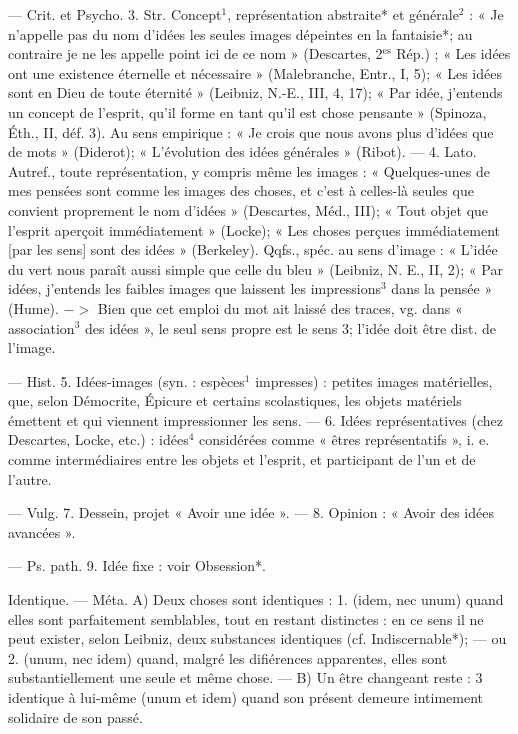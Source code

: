 — Crit. et Psycho. 3. Str. Concept$^1$, représentation abstraite* et
générale$^2$ : « Je n’appelle pas du nom
d’idées les seules images dépeintes en
la fantaisie*; au contraire je ne les
appelle point ici de ce nom » (Descartes, 2$^\text{es}$ Rép.) ; « Les idées ont une
existence éternelle et nécessaire »
(Malebranche, Entr., I, 5); « Les
idées sont en Dieu de toute éternité » (Leibniz, N.-E., III, 4, 17);
« Par idée, j'entends un concept de
l'esprit, qu'il forme en tant qu'il est
chose pensante » (Spinoza, Éth., II,
déf. 3). Au sens empirique : « Je
crois que nous avons plus d'idées
que de mots » (Diderot); « L’évolution des idées générales » (Ribot). —
4. Lato. Autref., toute représentation, y compris même les images :
« Quelques-unes de mes pensées
sont comme les images des choses,
et c’est à celles-là seules que convient proprement le nom d'idées »
(Descartes, Méd., III); « Tout objet
que l'esprit aperçoit immédiatement » (Locke); « Les choses perçues
immédiatement [par les sens] sont
des idées » (Berkeley). Qqfs., spéc.
au sens d'image : « L'idée du vert
nous paraît aussi simple que celle du
bleu » (Leibniz, N. E., II, 2); « Par
idées, j'entends les faibles images
que laissent les impressions$^3$ dans
la pensée » (Hume). $->$ Bien que
cet emploi du mot ait laissé des
traces, vg. dans « association$^3$ des
idées », le seul sens propre est le
sens 3; l'idée doit être dist. de
l’image.

— Hist. 5. Idées-images (syn. :
espèces$^1$ impresses) : petites images
matérielles, que, selon Démocrite,
Épicure et certains scolastiques, les
objets matériels émettent et qui viennent impressionner les sens. — 6.
Idées représentatives (chez Descartes, Locke, etc.) : idées$^4$ considérées comme « êtres représentatifs », i. e. comme intermédiaires
entre les objets et l’esprit, et participant de l’un et de l’autre.

— Vulg. 7. Dessein, projet
« Avoir une idée ». — 8. Opinion :
« Avoir des idées avancées ».

— Ps. path. 9. Idée fixe : voir
Obsession*.

Identique. — Méta. A) Deux choses
sont identiques : 1. (idem, nec unum)
quand elles sont parfaitement semblables, tout en restant distinctes :
en ce sens il ne peut exister, selon
Leibniz, deux substances identiques
(cf. Indiscernable*); — ou 2. (unum,
nec idem) quand, malgré les difiérences apparentes, elles sont substantiellement une seule et même
chose. — B) Un être changeant
reste : 3 identique à lui-même
(unum et idem) quand son présent
demeure intimement solidaire de
son passé.

